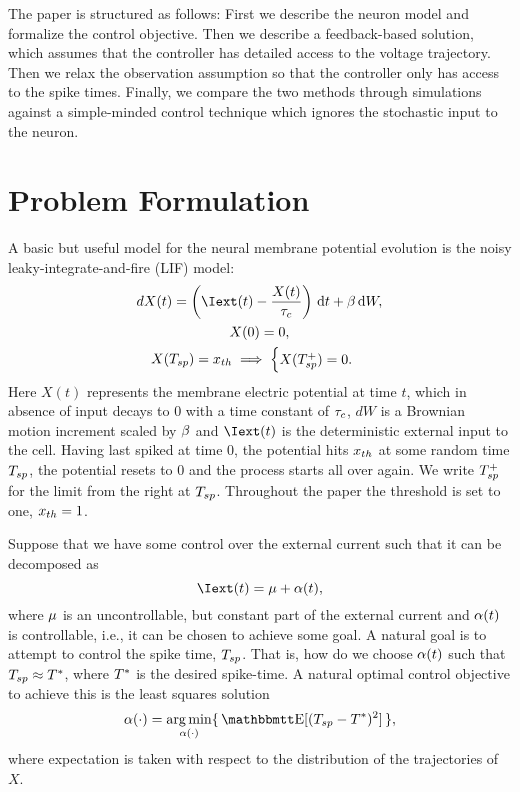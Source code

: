 The paper is structured as follows: First we describe the neuron model and
formalize the control objective. Then we describe a feedback-based solution,
which assumes that the controller has detailed access to the voltage trajectory.
Then we relax the observation assumption so that the controller only has access
to the spike times. Finally, we compare the two methods through
simulations against a simple-minded control technique which ignores
the stochastic input to the neuron.

\section{Problem Formulation}
A basic but useful model for the neural membrane potential evolution is the
noisy leaky-integrate-and-fire (LIF) model:
\begin{equation}
\begin{gathered}
dX(t) = \left(\Iext(t) - \frac{X(t)}{\tc} \right) \intd{t} + \b \intd{W},
\\
X(0) = 0,
\\
X(\ts) = \xth \implies
\begin{cases}
X(\ts^+) = 0. & 
\end{cases}
\end{gathered}
\label{eq:X_evolution_uo}
\end{equation}
Here $X(t)$ represents the membrane electric potential at time $t$, which in
absence of input decays to $0$ with a time constant of $\tau_c$, $dW$ is a Brownian
motion increment scaled by $\beta$ and $\Iext(t)$ is the deterministic external input to the cell. Having last
spiked at time $0$, the potential hits ${ x_{th} }$ at some random time $T_{sp}$, the
potential resets to $0$ and the process starts all over again. 
We write $T_{sp}^+$ for the limit from the right at $T_{sp}$.
Throughout the paper the threshold is set to one, ${ x_{th} } = 1$.

Suppose that we have some control over the external current such that it can be
decomposed as
\begin{equation}
\Iext(t) = \m + \a(t),
\label{eq:current_mu_alpha}
\end{equation}
where ${\mu }$ is an uncontrollable, but constant part of the external current and
$\alpha(t)$ is controllable, i.e., it can be chosen to achieve some goal.
A natural goal is to attempt to control the spike time, $T_{sp}$.
That is, how do we choose $\alpha(t)$ such that $T_{sp} \approx { T^* }$, where ${ T^* }$ is the
desired spike-time. A natural optimal control objective to achieve this is the
least squares solution
\begin{equation}
\a(\cdot) = \argmin_{\a(\cdot)} \{\, \Exp[(\ts- \T)^2] \,\},
\label{eq:OC_LS_variance}
\end{equation}
where expectation is taken with respect to the distribution of the trajectories
of $X$.

